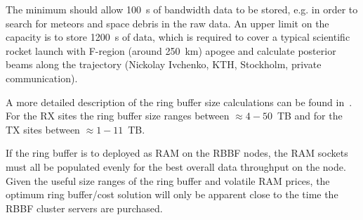 \documentclass[12pt,a4paper]{article}
\begin{document}
The minimum \RB should allow 100~s of \NBW{} bandwidth data to be stored, e.g. in order to search for meteors and space debris in the raw data.
An upper limit on the \RB capacity is to store 1200~s of \WBW{} data, which is required to cover a typical scientific rocket launch with F-region (around 250~km) apogee and calculate posterior beams along the trajectory (Nickolay Ivchenko, KTH, Stockholm, private communication). 

A more detailed description of the ring buffer size calculations can be found in~\cite{e3dds-do1}.
For the RX sites the ring buffer size ranges between $\approx 4 - 50$~TB and for the TX sites between $\approx 1 - 11$~TB.

If the ring buffer is to deployed as RAM on the RBBF nodes, the RAM sockets must all be populated evenly for the best overall data throughput on the node.
Given the useful size ranges of the ring buffer and volatile RAM prices, the optimum ring buffer/cost solution will only be apparent close to the time the RBBF cluster servers are purchased.
 
\end{document}
